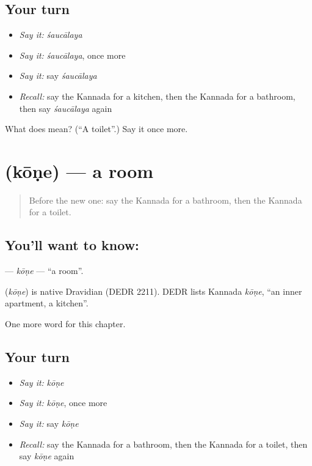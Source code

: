 \subsection*{Your turn}
\begin{itemize}
\raggedright
  \item \emph{Say it:} \emph{śaucālaya}
  \item \emph{Say it:} \emph{śaucālaya}, once more
  \item \emph{Say it:} say \emph{śaucālaya}
  \item \emph{Recall:} say the Kannada for a kitchen, then the Kannada for a bathroom, then say \emph{śaucālaya} again
\end{itemize}

\begin{tcolorbox}[breakable,colback=teal!4,colframe=teal!35!black,title={Before you move on}]
What does  mean? (\textquotedblleft{}A toilet\textquotedblright{}.) Say it once more.
\end{tcolorbox}
\section[\texorpdfstring{\kn{ಕೋಣೆ} (kōṇe)}{ಕೋಣೆ (kōṇe)}]{ (kōṇe) — a room}

\label{lesson:KA-C173-kone}



\begin{quote}
Before the new one: say the Kannada for a bathroom, then the Kannada for a toilet.
\end{quote}

\subsection*{You'll want to know: }
\textbf{} — \emph{kōṇe} — \textquotedblleft{}a room\textquotedblright{}.

\begin{cousinweb}
\textbf{} (\emph{kōṇe}) is native Dravidian (DEDR 2211). DEDR lists Kannada \emph{kōṇe}, \textquotedblleft{}an inner apartment, a kitchen\textquotedblright{}.
\end{cousinweb}

\begin{grammarlens}[title={What you've built}]
One more word for this chapter.
\end{grammarlens}

\subsection*{Your turn}
\begin{itemize}
\raggedright
  \item \emph{Say it:} \emph{kōṇe}
  \item \emph{Say it:} \emph{kōṇe}, once more
  \item \emph{Say it:} say \emph{kōṇe}
  \item \emph{Recall:} say the Kannada for a bathroom, then the Kannada for a toilet, then say \emph{kōṇe} again
\end{itemize}

